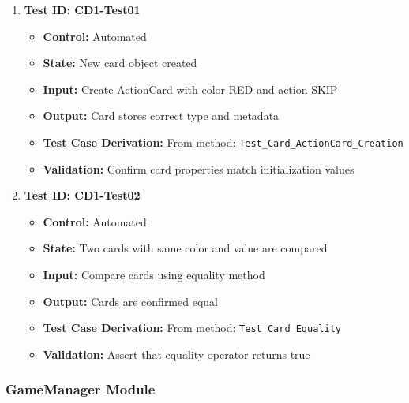 \documentclass[12pt]{article}
\begin{document}
\begin{enumerate}
    \item \textbf{Test ID: CD1-Test01}
    \begin{itemize}
        \item \textbf{Control:} Automated
        \item \textbf{State:} New card object created
        \item \textbf{Input:} Create ActionCard with color RED and action SKIP
        \item \textbf{Output:} Card stores correct type and metadata
        \item \textbf{Test Case Derivation:} From method: \texttt{Test\_Card\_ActionCard\_Creation}
        \item \textbf{Validation:} Confirm card properties match initialization values
    \end{itemize}

    \item \textbf{Test ID: CD1-Test02}
    \begin{itemize}
        \item \textbf{Control:} Automated
        \item \textbf{State:} Two cards with same color and value are compared
        \item \textbf{Input:} Compare cards using equality method
        \item \textbf{Output:} Cards are confirmed equal
        \item \textbf{Test Case Derivation:} From method: \texttt{Test\_Card\_Equality}
        \item \textbf{Validation:} Assert that equality operator returns true
    \end{itemize}
\end{enumerate}

\subsubsection{GameManager Module}
\end{document}
